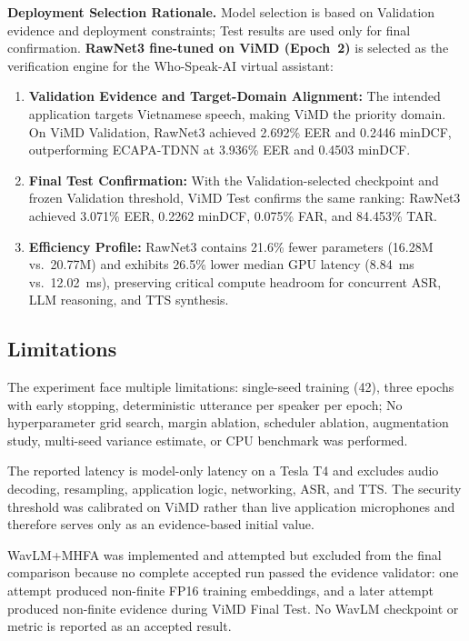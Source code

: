 \textbf{Deployment Selection Rationale.} Model selection is based on Validation evidence and deployment constraints; Test results are used only for final confirmation. \textbf{RawNet3 fine-tuned on ViMD (Epoch~2)} is selected as the verification engine for the Who-Speak-AI virtual assistant:

\begin{enumerate}
    \item \textbf{Validation Evidence and Target-Domain Alignment:} The intended application targets Vietnamese speech, making ViMD the priority domain. On ViMD Validation, RawNet3 achieved 2.692\% EER and 0.2446 minDCF, outperforming ECAPA-TDNN at 3.936\% EER and 0.4503 minDCF.

    \item \textbf{Final Test Confirmation:} With the Validation-selected checkpoint and frozen Validation threshold, ViMD Test confirms the same ranking: RawNet3 achieved 3.071\% EER, 0.2262 minDCF, 0.075\% FAR, and 84.453\% TAR.

    \item \textbf{Efficiency Profile:} RawNet3 contains 21.6\% fewer parameters (16.28M vs.\ 20.77M) and exhibits 26.5\% lower median GPU latency (8.84~ms vs.\ 12.02~ms), preserving critical compute headroom for concurrent ASR, LLM reasoning, and TTS synthesis.
\end{enumerate}

\subsection{Limitations}

The experiment face multiple limitations: single-seed training (42), three epochs with early stopping, deterministic utterance per speaker per epoch; No hyperparameter grid search, margin ablation, scheduler ablation, augmentation study, multi-seed variance estimate, or CPU benchmark was performed.

The reported latency is model-only latency on a Tesla T4 and excludes audio decoding, resampling, application logic, networking, ASR, and TTS. The security threshold was calibrated on ViMD rather than live application microphones and therefore serves only as an evidence-based initial value.

WavLM+MHFA was implemented and attempted but excluded from the final comparison because no complete accepted run passed the evidence validator: one attempt produced non-finite FP16 training embeddings, and a later attempt produced non-finite evidence during ViMD Final Test. No WavLM checkpoint or metric is reported as an accepted result.
